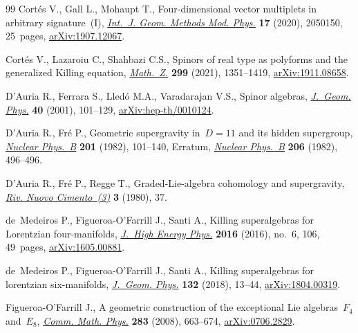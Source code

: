 \documentclass[pdftex]{sigma}
\numberwithin{equation}{section}
\newcommand{\1}{\mathbbm{1}}
\begin{document}
\begin{thebibliography}{99}
Cort\'es V., Gall L., Mohaupt T., Four-dimensional vector multiplets in
 arbitrary signature~({I}),
 \href{https://doi.org/10.1142/S0219887820501509}{\textit{Int.~J. Geom.
 Methods Mod. Phys.}} \textbf{17} (2020), 2050150, 25~pages,
 \href{http://arxiv.org/abs/1907.12067}{arXiv:1907.12067}.

Cort\'es V., Lazaroiu C., Shahbazi C.S., Spinors of real type as polyforms and
 the generalized {K}illing equation,
 \href{https://doi.org/10.1007/s00209-021-02726-6}{\textit{Math.~Z.}}
 \textbf{299} (2021), 1351--1419,
 \href{http://arxiv.org/abs/1911.08658}{arXiv:1911.08658}.

D'Auria R., Ferrara S., Lled\'o M.A., Varadarajan V.S., Spinor algebras,
 \href{https://doi.org/10.1016/S0393-0440(01)00023-7}{\textit{J.~Geom. Phys.}}
 \textbf{40} (2001), 101--129,
 \href{http://arxiv.org/abs/hep-th/0010124}{arXiv:hep-th/0010124}.

D'Auria R., Fr\'e P., Geometric supergravity in~{$D=11$} and its hidden
 supergroup,
 \href{https://doi.org/10.1016/0550-3213(82)90376-5}{\textit{Nuclear Phys.~B}}
 \textbf{201} (1982), 101--140, {E}rratum,
 \href{https://doi.org/10.1016/0550-3213(82)90281-4}{\textit{Nuclear Phys.~B}}
 \textbf{206} (1982), 496--496.

D'Auria R., Fr\'e P., Regge T., Graded-{L}ie-algebra cohomology and
 supergravity, \href{https://doi.org/10.1007/BF02905929}{\textit{Riv. Nuovo
 Cimento~(3)}} \textbf{3} (1980), 37.

de~Medeiros P., Figueroa-O'Farrill J., Santi A., Killing superalgebras for
 {L}orentzian four-manifolds,
 \href{https://doi.org/10.1007/JHEP06(2016)106}{\textit{J.~High Energy Phys.}}
 \textbf{2016} (2016), no.~6, 106, 49~pages,
 \href{http://arxiv.org/abs/1605.00881}{arXiv:1605.00881}.

de~Medeiros P., Figueroa-O'Farrill J., Santi A., Killing superalgebras for
 lorentzian six-manifolds,
 \href{https://doi.org/10.1016/j.geomphys.2018.05.019}{\textit{J.~Geom.
 Phys.}} \textbf{132} (2018), 13--44,
 \href{http://arxiv.org/abs/1804.00319}{arXiv:1804.00319}.

Figueroa-O'Farrill J., A geometric construction of the exceptional {L}ie
 algebras~{$F_4$} and~{$E_8$},
 \href{https://doi.org/10.1007/s00220-008-0581-7}{\textit{Comm. Math. Phys.}}
 \textbf{283} (2008), 663--674,
 \href{http://arxiv.org/abs/0706.2829}{arXiv:0706.2829}.


\end{thebibliography}
\end{document}
